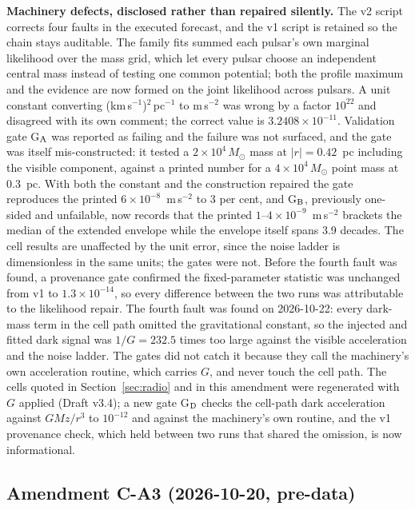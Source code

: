 \documentclass[11pt]{article}
\newcommand{\msun}{\ensuremath{M_\odot}}
\begin{document}
\textbf{Machinery defects, disclosed rather than repaired silently.} The v2 script corrects four faults in the executed forecast, and the v1 script is retained so the chain stays auditable. The family fits summed each pulsar's own marginal likelihood over the mass grid, which let every pulsar choose an independent central mass instead of testing one common potential; both the profile maximum and the evidence are now formed on the joint likelihood across pulsars. A unit constant converting (km\,s$^{-1}$)$^{2}$\,pc$^{-1}$ to m\,s$^{-2}$ was wrong by a factor $10^{22}$ and disagreed with its own comment; the correct value is $3.2408\times10^{-11}$. Validation gate G$_{\rm A}$ was reported as failing and the failure was not surfaced, and the gate was itself mis-constructed: it tested a $2\times10^{4}\,\msun$ mass at $|r| = 0.42$~pc including the visible component, against a printed number for a $4\times10^{4}\,\msun$ point mass at $0.3$~pc. With both the constant and the construction repaired the gate reproduces the printed $6\times10^{-8}$~m\,s$^{-2}$ to 3 per cent, and G$_{\rm B}$, previously one-sided and unfailable, now records that the printed $1$--$4\times10^{-9}$~m\,s$^{-2}$ brackets the median of the extended envelope while the envelope itself spans 3.9 decades. The cell results are unaffected by the unit error, since the noise ladder is dimensionless in the same units; the gates were not. Before the fourth fault was found, a provenance gate confirmed the fixed-parameter statistic was unchanged from v1 to $1.3\times10^{-14}$, so every difference between the two runs was attributable to the likelihood repair. The fourth fault was found on 2026-10-22: every dark-mass term in the cell path omitted the gravitational constant, so the injected and fitted dark signal was $1/G = 232.5$ times too large against the visible acceleration and the noise ladder. The gates did not catch it because they call the machinery's own acceleration routine, which carries $G$, and never touch the cell path. The cells quoted in Section~\ref{sec:radio} and in this amendment were regenerated with $G$ applied (Draft v3.4); a new gate G$_{\rm D}$ checks the cell-path dark acceleration against $GMz/r^{3}$ to $10^{-12}$ and against the machinery's own routine, and the v1 provenance check, which held between two runs that shared the omission, is now informational.

\subsection{Amendment C-A3 (2026-10-20, pre-data)}
\label{sec:amendmentca3}
\end{document}
